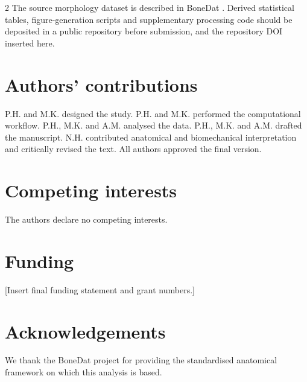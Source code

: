 \documentclass[openacc]{rsproca_new}
\begin{document}
\begin{multicols}{2}
The source morphology dataset is described in BoneDat \cite{HenysKuchar2025}. Derived statistical tables, figure-generation scripts and supplementary processing code should be deposited in a public repository before submission, and the repository DOI inserted here.

\section*{Authors' contributions}

P.H. and M.K. designed the study. P.H. and M.K. performed the computational workflow. P.H., M.K. and A.M. analysed the data. P.H., M.K. and A.M. drafted the manuscript. N.H. contributed anatomical and biomechanical interpretation and critically revised the text. All authors approved the final version.

\section*{Competing interests}

The authors declare no competing interests.

\section*{Funding}

[Insert final funding statement and grant numbers.]

\section*{Acknowledgements}

We thank the BoneDat project for providing the standardised anatomical framework on which this analysis is based.

\end{multicols}
\end{document}
